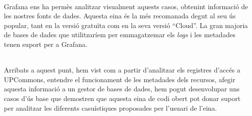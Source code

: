 \noindent \\
Grafana ens ha permès analitzar visualment aquests casos, obtenint informació de les nostres fonts de dades.
Aquesta eina és la més recomanada degut al seu ús popular, tant en la versió gratuïta com en la seva versió “Cloud”.
La gran majoria de bases de dades que utilitzaríem per emmagatzemar els \textit{\gls{log}s} i les metadades tenen suport per a Grafana.

\noindent \\
Arribats a aquest punt, hem vist com a partir d'analitzar els registres d'accés a \gls{UPCommons}, entendre el funcionament de les metadades dels recursos, afegir aquesta informació a un gestor de bases de dades, hem pogut desenvolupar uns casos d'ús base que demostren que aquesta eina de codi obert pot donar suport per analitzar les diferents casuístiques proposades per l'usuari de l'eina.

